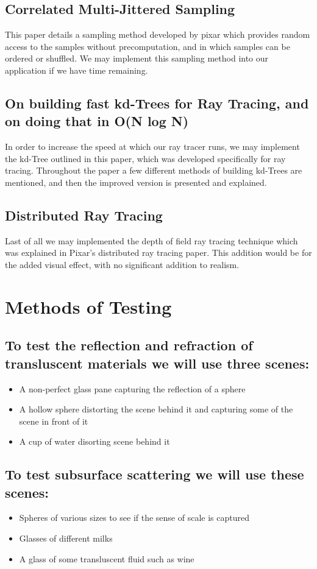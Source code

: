 \documentclass[journal, a4paper]{IEEEtran}
\begin{document}
        \subsection{Correlated Multi-Jittered Sampling}
        This paper details a sampling method developed by pixar which provides random access to the samples without precomputation, and in which samples can be ordered or shuffled. We may implement this sampling method into our application if we have time remaining.
    \subsection{On building fast kd-Trees for Ray Tracing, and on doing that in O(N log N)}
        In order to increase the speed at which our ray tracer runs, we may implement the kd-Tree outlined in this paper, which was developed specifically for ray tracing. Throughout the paper a few different methods of building kd-Trees are mentioned, and then the improved version is presented and explained.
    \subsection{Distributed Ray Tracing}
        Last of all we may implemented the depth of field ray tracing technique which was explained in Pixar's distributed ray tracing paper. This addition would be for the added visual effect, with no significant addition to realism.

\section{Methods of Testing}
    \subsection{To test the reflection and refraction of transluscent materials we will use three scenes:}
        \begin{itemize}
            \item A non-perfect glass pane capturing the reflection of a sphere
            \item A hollow sphere distorting the scene behind it and capturing some of the scene in front of it
            \item A cup of water disorting scene behind it
        \end{itemize}
    \subsection{To test subsurface scattering we will use these scenes:}
        \begin{itemize}
            \item Spheres of various sizes to see if the sense of scale is captured
            \item Glasses of different milks
            \item A glass of some transluscent fluid such as wine
        \end{itemize}
\end{document}
